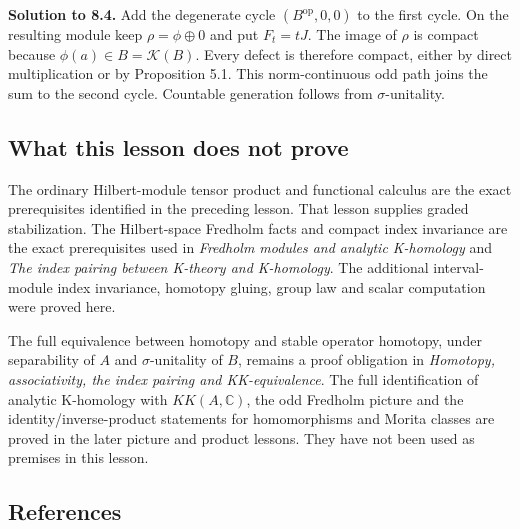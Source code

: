 \documentclass[
  11pt,
]{article}
\begin{document}
\textbf{Solution to 8.4.} Add the degenerate cycle
\((B^{\mathrm{op}},0,0)\) to the first cycle. On the resulting module
keep \(\rho=\phi\oplus0\) and put \(F_t=tJ\). The image of \(\rho\) is
compact because \(\phi(a)\in B=\mathcal K(B)\). Every defect is
therefore compact, either by direct multiplication or by Proposition
5.1. This norm-continuous odd path joins the sum to the second cycle.
Countable generation follows from \(\sigma\)-unitality.

\subsection{What this lesson does not
prove}\label{what-this-lesson-does-not-prove}

The ordinary Hilbert-module tensor product and functional calculus are
the exact prerequisites identified in the preceding lesson. That lesson
supplies graded stabilization. The Hilbert-space Fredholm facts and
compact index invariance are the exact prerequisites used in
\emph{Fredholm modules and analytic K-homology} and \emph{The index
pairing between K-theory and K-homology}. The additional interval-module
index invariance, homotopy gluing, group law and scalar computation were
proved here.

The full equivalence between homotopy and stable operator homotopy,
under separability of \(A\) and \(\sigma\)-unitality of \(B\), remains a
proof obligation in \emph{Homotopy, associativity, the index pairing and
KK-equivalence}. The full identification of analytic K-homology with
\(KK(A,\mathbb C)\), the odd Fredholm picture and the
identity/inverse-product statements for homomorphisms and Morita classes
are proved in the later picture and product lessons. They have not been
used as premises in this lesson.

\subsection{References}\label{references}
\end{document}
